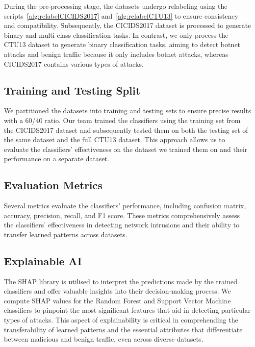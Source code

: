 During the pre-processing stage, the datasets undergo relabeling using the scripts~\ref{alg:relabelCICIDS2017} and~\ref{alg:relabelCTU13} to ensure consistency and compatibility. Subsequently, the CICIDS2017 dataset is processed to generate binary and multi-class classification tasks. In contrast, we only process the CTU13 dataset to generate binary classification tasks, aiming to detect botnet attacks and benign traffic because it only includes botnet attacks, whereas CICIDS2017 contains various types of attacks.

\subsection{Training and Testing Split}\label{subsec:TrainingTestingSplit}

We partitioned the datasets into training and testing sets to ensure precise results with a 60/40 ratio. Our team trained the classifiers using the training set from the CICIDS2017 dataset and subsequently tested them on both the testing set of the same dataset and the full CTU13 dataset. This approach allows us to evaluate the classifiers' effectiveness on the dataset we trained them on and their performance on a separate dataset.

\subsection{Evaluation Metrics}\label{subsec:EvaluationMetrics}

Several metrics evaluate the classifiers' performance, including confusion matrix, accuracy, precision, recall, and F1 score. These metrics comprehensively assess the classifiers' effectiveness in detecting network intrusions and their ability to transfer learned patterns across datasets.

\subsection{Explainable AI}\label{subsec:ExplainableAI}

The SHAP library is utilised to interpret the predictions made by the trained classifiers and offer valuable insights into their decision-making process. We compute SHAP values for the Random Forest and Support Vector Machine classifiers to pinpoint the most significant features that aid in detecting particular types of attacks. This aspect of explainability is critical in comprehending the transferability of learned patterns and the essential attributes that differentiate between malicious and benign traffic, even across diverse datasets.

